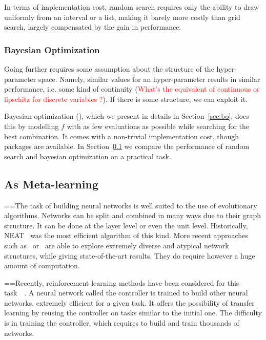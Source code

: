 In terms of implementation cost, random search requires only the ability to draw uniformly from an interval or a list, making it barely more costly than grid search, largely compensated by the gain in performance.

\subsubsection{Bayesian Optimization}

Going further requires some assumption about the structure of the hyper-parameter space. Namely, similar values for an hyper-parameter results in similar performance, i.e. some kind of continuity (\textcolor{red}{What's the equivalent of continuous or lipschitz for discrete variables ?}). If there is some structure, we can exploit it.

Bayesian optimization (\textcite{bergstra2011NIPS}), which we present in details in Section~\ref{sec:bo}, does this by modelling $f$ with as few evaluations as possible while searching for the best combination. It comes with a non-trivial implementation cost, though packages are available. In Section~\ref{} we compare the performance of random search and bayesian optimization on a practical task.

\subsection{As Meta-learning}

==The task of building neural networks is well suited to the use of evolutionary algorithms. Networks can be split and combined in many ways due to their graph structure. It can be done at the layer level or even the unit level. Historically, NEAT~\cite{stanley2002EC} was the most efficient algorithm of this kind. More recent approaches such as~\cite{real2017ICML} or~\cite{miikkulainen2017} are able to explore extremely diverse and atypical network structures, while giving state-of-the-art results. They do require however a huge amount of computation.

==Recently, reinforcement learning methods have been considered for this task~\cite{baker2017ICLR}~\cite{zoph2017ICLR}. A neural network called the controller is trained to build other neural networks, extremely efficient for a given task. It offers the possibility of transfer learning by reusing the controller on tasks similar to the initial one. The difficulty is in training the controller, which requires to build and train thousands of networks. 


